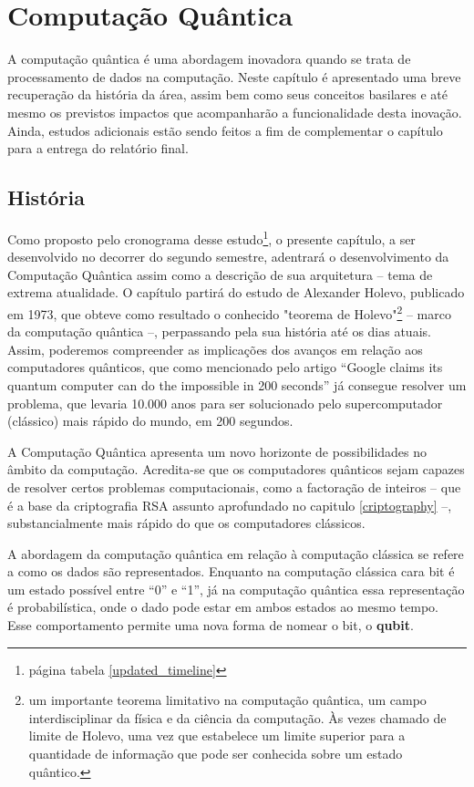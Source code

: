 \section{Computação Quântica} 
\label{quantum_comp}

A computação quântica é uma abordagem inovadora quando se trata de processamento de dados na computação. Neste capítulo é apresentado uma breve recuperação da história da área, assim bem como seus conceitos basilares e até mesmo os previstos impactos que acompanharão a funcionalidade desta inovação. Ainda, estudos adicionais estão sendo feitos a fim de complementar o capítulo para a entrega do relatório final.

\subsection{História}
Como proposto pelo cronograma desse estudo\footnote{página \pageref{updated_timeline} tabela \ref{updated_timeline}}, o presente capítulo, a ser desenvolvido no decorrer do segundo semestre, adentrará o desenvolvimento da Computação Quântica assim como a descrição de sua arquitetura – tema de extrema atualidade. O capítulo partirá do estudo de Alexander Holevo, publicado em 1973, que obteve como resultado o conhecido "teorema de Holevo"\footnote{um importante teorema limitativo na computação quântica, um campo interdisciplinar da física e da ciência da computação. Às vezes chamado de limite de Holevo, uma vez que estabelece um limite superior para a quantidade de informação que pode ser conhecida sobre um estado quântico.} – marco da computação quântica –, perpassando pela sua história até os dias atuais. Assim, poderemos compreender as implicações dos avanços em relação aos computadores quânticos, que como mencionado pelo artigo “Google claims its quantum computer can do the impossible in 200 seconds” \cite{16} já consegue resolver um problema, que levaria 10.000 anos para ser solucionado pelo supercomputador (clássico) mais rápido do mundo, em 200 segundos.

A Computação Quântica apresenta um novo horizonte de possibilidades no âmbito da computação. Acredita-se que os computadores quânticos sejam capazes de resolver certos problemas computacionais, como a factoração de inteiros – que é a base da criptografia RSA assunto aprofundado no capitulo \ref{criptography} –, substancialmente mais rápido do que os computadores clássicos.

A abordagem da computação quântica em relação à computação clássica se refere a como os dados são representados. Enquanto na computação clássica cara bit é um estado possível entre ``0'' e ``1'', já na computação quântica essa representação é probabilística, onde o dado pode estar em ambos estados ao mesmo tempo. Esse comportamento permite uma nova forma de nomear o bit, o \textbf{qubit}.

